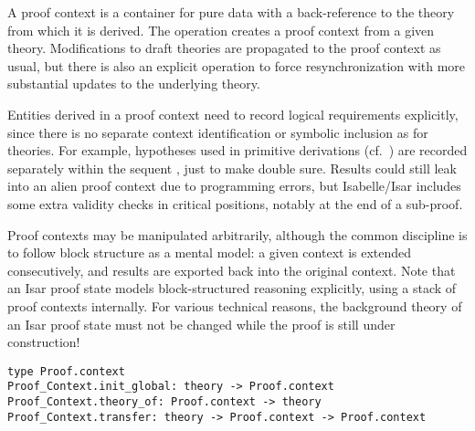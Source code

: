 \begin{isabellebody}
\begin{isamarkuptext}
\begin{description}
  \end{description}%
\end{isamarkuptext}%
\isamarkuptrue%
%
\endisatagmlantiq
{\isafoldmlantiq}%
%
\isadelimmlantiq
%
\endisadelimmlantiq
%
\isamarkuptrue%
%
\begin{isamarkuptext}%
A proof context is a container for pure data with a
  back-reference to the theory from which it is derived.  The  operation creates a proof context from a given theory.
  Modifications to draft theories are propagated to the proof context
  as usual, but there is also an explicit  operation
  to force resynchronization with more substantial updates to the
  underlying theory.

  Entities derived in a proof context need to record logical
  requirements explicitly, since there is no separate context
  identification or symbolic inclusion as for theories.  For example,
  hypotheses used in primitive derivations (cf.\ )
  are recorded separately within the sequent , just to
  make double sure.  Results could still leak into an alien proof
  context due to programming errors, but Isabelle/Isar includes some
  extra validity checks in critical positions, notably at the end of a
  sub-proof.

  Proof contexts may be manipulated arbitrarily, although the common
  discipline is to follow block structure as a mental model: a given
  context is extended consecutively, and results are exported back
  into the original context.  Note that an Isar proof state models
  block-structured reasoning explicitly, using a stack of proof
  contexts internally.  For various technical reasons, the background
  theory of an Isar proof state must not be changed while the proof is
  still under construction!%
\end{isamarkuptext}%
\isamarkuptrue%
%
\isadelimmlref
%
\endisadelimmlref
%
\isatagmlref
%
\begin{isamarkuptext}%
\begin{mldecls}
  \verb|type Proof.context| \\
  \verb|Proof_Context.init_global: theory -> Proof.context| \\
  \verb|Proof_Context.theory_of: Proof.context -> theory| \\
  \verb|Proof_Context.transfer: theory -> Proof.context -> Proof.context| \\
  \end{mldecls}


\end{isamarkuptext}
\end{isabellebody}
